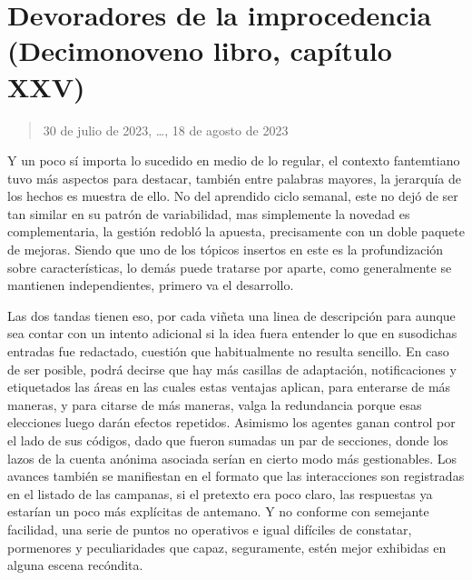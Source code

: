 \documentclass[
]{book}
\begin{document}
\hypertarget{devoradores-de-la-improcedencia-decimonoveno-libro-capuxedtulo-xxv}{%
\section{Devoradores de la improcedencia (Decimonoveno libro, capítulo XXV)}\label{devoradores-de-la-improcedencia-decimonoveno-libro-capuxedtulo-xxv}}

\begin{quote}
30 de julio de 2023, \ldots, 18 de agosto de 2023
\end{quote}

Y un poco sí importa lo sucedido en medio de lo regular, el contexto fantemtiano tuvo más aspectos para destacar, también entre palabras mayores, la jerarquía de los hechos es muestra de ello. No del aprendido ciclo semanal, este no dejó de ser tan similar en su patrón de variabilidad, mas simplemente la novedad es complementaria, la gestión redobló la apuesta, precisamente con un doble paquete de mejoras. Siendo que uno de los tópicos insertos en este es la profundización sobre características, lo demás puede tratarse por aparte, como generalmente se mantienen independientes, primero va el desarrollo.

Las dos tandas tienen eso, por cada viñeta una linea de descripción para aunque sea contar con un intento adicional si la idea fuera entender lo que en susodichas entradas fue redactado, cuestión que habitualmente no resulta sencillo. En caso de ser posible, podrá decirse que hay más casillas de adaptación, notificaciones y etiquetados las áreas en las cuales estas ventajas aplican, para enterarse de más maneras, y para citarse de más maneras, valga la redundancia porque esas elecciones luego darán efectos repetidos. Asimismo los agentes ganan control por el lado de sus códigos, dado que fueron sumadas un par de secciones, donde los lazos de la cuenta anónima asociada serían en cierto modo más gestionables. Los avances también se manifiestan en el formato que las interacciones son registradas en el listado de las campanas, si el pretexto era poco claro, las respuestas ya estarían un poco más explícitas de antemano. Y no conforme con semejante facilidad, una serie de puntos no operativos e igual difíciles de constatar, pormenores y peculiaridades que capaz, seguramente, estén mejor exhibidas en alguna escena recóndita.
\end{document}
